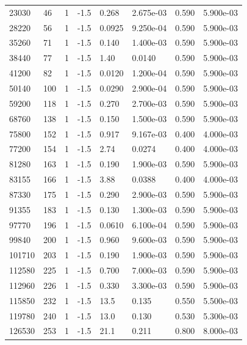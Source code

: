 \documentclass[preview]{standalone}
\begin{document}
{{{{{{{{{\begin{tabular}{L{1.2cm}C{1.2cm} C{0.3cm}C{0.5cm} C{1.4cm}C{1.4cm} C{1.4cm}C{1.4cm}}
  23030  &    46  & 1     & -1.5 &  0.268  & 2.675e-03  & 0.590 &  5.900e-03   \\ 
  28220  &    56  & 1     & -1.5 &  0.0925  & 9.250e-04  & 0.590 &  5.900e-03   \\ 
  35260  &    71  & 1     & -1.5 &  0.140  & 1.400e-03  & 0.590 &  5.900e-03   \\ 
  38440  &    77  & 1     & -1.5 &  1.40  & 0.0140  & 0.590 &  5.900e-03   \\ 
  41200  &    82  & 1     & -1.5 &  0.0120  & 1.200e-04  & 0.590 &  5.900e-03   \\ 
  50140  &   100  & 1     & -1.5 &  0.0290  & 2.900e-04  & 0.590 &  5.900e-03   \\ 
  59200  &   118  & 1     & -1.5 &  0.270  & 2.700e-03  & 0.590 &  5.900e-03   \\ 
  68760  &   138  & 1     & -1.5 &  0.150  & 1.500e-03  & 0.590 &  5.900e-03   \\ 
  75800  &   152  & 1     & -1.5 &  0.917  & 9.167e-03  & 0.400 &  4.000e-03   \\ 
  77200  &   154  & 1     & -1.5 &  2.74  & 0.0274  & 0.400 &  4.000e-03   \\ 
  81280  &   163  & 1     & -1.5 &  0.190  & 1.900e-03  & 0.590 &  5.900e-03   \\ 
  83155  &   166  & 1     & -1.5 &  3.88  & 0.0388  & 0.400 &  4.000e-03   \\ 
  87330  &   175  & 1     & -1.5 &  0.290  & 2.900e-03  & 0.590 &  5.900e-03   \\ 
  91355  &   183  & 1     & -1.5 &  0.130  & 1.300e-03  & 0.590 &  5.900e-03   \\ 
  97770  &   196  & 1     & -1.5 &  0.0610  & 6.100e-04  & 0.590 &  5.900e-03   \\ 
  99840  &   200  & 1     & -1.5 &  0.960  & 9.600e-03  & 0.590 &  5.900e-03   \\ 
  101710  &   203  & 1     & -1.5 &  0.190  & 1.900e-03  & 0.590 &  5.900e-03   \\ 
  112580  &   225  & 1     & -1.5 &  0.700  & 7.000e-03  & 0.590 &  5.900e-03   \\ 
  112960  &   226  & 1     & -1.5 &  0.330  & 3.300e-03  & 0.590 &  5.900e-03   \\ 
  115850  &   232  & 1     & -1.5 &  13.5  & 0.135  & 0.550 &  5.500e-03   \\ 
  119780  &   240  & 1     & -1.5 &  13.0  & 0.130  & 0.530 &  5.300e-03   \\ 
  126530  &   253  & 1     & -1.5 &  21.1  & 0.211  & 0.800 &  8.000e-03   \\ 

\end{tabular}}}}}}}}}}
\end{document}
